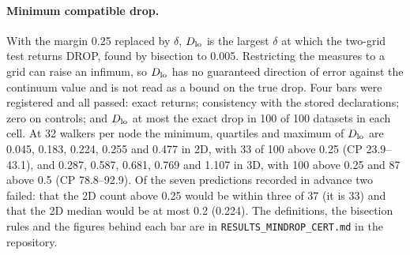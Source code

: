 \documentclass[aps,pre,twocolumn,superscriptaddress,nofootinbib,10pt]{revtex4-2}
\begin{document}
\paragraph*{Minimum compatible drop.}
With the margin 0.25 replaced by $\delta$, $D_{\rm lo}$ is the largest $\delta$ at which the two-grid test returns DROP, found by bisection to 0.005. Restricting the measures to a grid can raise an infimum, so $D_{\rm lo}$ has no guaranteed direction of error against the continuum value and is not read as a bound on the true drop. Four bars were registered and all passed: exact returns; consistency with the stored declarations; zero on controls; and $D_{\rm lo}$ at most the exact drop in 100 of 100 datasets in each cell. At 32 walkers per node the minimum, quartiles and maximum of $D_{\rm lo}$ are 0.045, 0.183, 0.224, 0.255 and 0.477 in 2D, with 33 of 100 above 0.25 (CP 23.9--43.1), and 0.287, 0.587, 0.681, 0.769 and 1.107 in 3D, with 100 above 0.25 and 87 above 0.5 (CP 78.8--92.9). Of the seven predictions recorded in advance two failed: that the 2D count above 0.25 would be within three of 37 (it is 33) and that the 2D median would be at most 0.2 (0.224). The definitions, the bisection rules and the figures behind each bar are in \texttt{RESULTS\_MINDROP\_CERT.md} in the repository.
\end{document}
